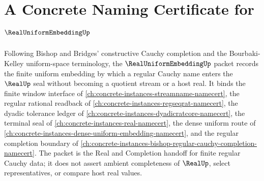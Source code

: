 \chapter{A Concrete Naming Certificate for $\RealUniformEmbeddingUp$}
\label{ch:concrete-instances-real-uniform-embedding-namecert}

Following Bishop and Bridges' constructive Cauchy completion and the Bourbaki-Kelley uniform-space terminology, the $\RealUniformEmbeddingUp$ packet records the finite uniform embedding by which a regular Cauchy name enters the $\RealUp$ seal without becoming a quotient stream or a host real. It binds the finite window interface of \autoref{ch:concrete-instances-streamname-namecert}, the regular rational readback of \autoref{ch:concrete-instances-regseqrat-namecert}, the dyadic tolerance ledger of \autoref{ch:concrete-instances-dyadicratcore-namecert}, the terminal seal of \autoref{ch:concrete-instances-real-namecert}, the dense uniform route of \autoref{ch:concrete-instances-dense-uniform-embedding-namecert}, and the regular completion boundary of \autoref{ch:concrete-instances-bishop-regular-cauchy-completion-namecert}. The packet is the Real and Completion handoff for finite regular Cauchy data; it does not assert ambient completeness of $\RealUp$, select representatives, or compare host real values.

